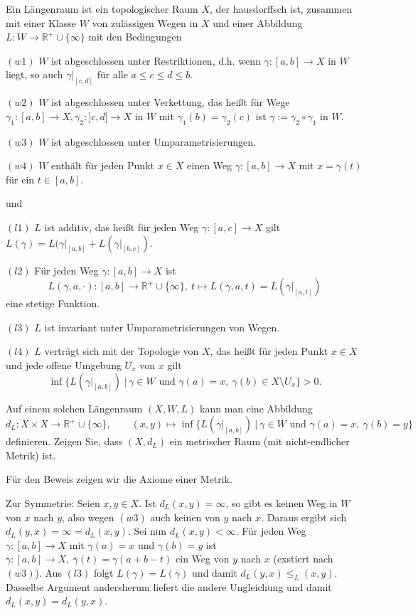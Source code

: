 \documentclass[11pt]{book}
\numberwithin{dummy}{section}
\theoremstyle{nonumberbreak}
\newenvironment{prob}[1][]{\ifthenelse{\equal{#1}{}}{\problem}{\problem[#1]}\rm}{\endproblem}
\newenvironment{sol}[1][]{\ifthenelse{\equal{#1}{}}{\solution}{\solution[#1]}\rm}{\endsolution}
\newcommand{\R}{\mathbb{R}}
\newcommand{\la}{\longrightarrow}
\begin{document}
\begin{spacing}{1.4}
\begin{prob}   %
Ein Längenraum ist ein topologischer Raum $X$, der hausdorffsch ist, zusammen mit einer Klasse $W$ von zulässigen Wegen in $X$ und einer Abbildung $L: W \la \R^+\cup \{\infty\}$ mit den Bedingungen
\begin{compactenum}
\item[$(w1)$] $W$ ist abgeschlossen unter Restriktionen, d.h. wenn $\gamma:[a,b] \la X$ in $W$ liegt, so auch $\gamma\vert_{[c,d]}$ für alle $a\leqslant c\leqslant d\leqslant b$.
\item[$(w2)$] $W$ ist abgeschlossen unter Verkettung, das heißt für Wege $\gamma_1:[a,b] \la X, \gamma_2:]c,d]\la X$ in $W$ mit $\gamma_1(b)=\gamma_2(c)$ ist $\gamma:=\gamma_2 \circ \gamma_1$ in $W$.
\item[$(w3)$] $W$ ist abgeschlossen unter Umparametrisierungen.
\item[$(w4)$] $W$ enthält für jeden Punkt $x \in X$ einen Weg $\gamma:[a,b]\la X$ mit $x=\gamma(t)$ für ein $t\in[a,b]$.
\end{compactenum}
und
\begin{compactenum}
\item[$(l1)$] $L$ ist additiv, das heißt für jeden Weg $\gamma:[a,c]\la X$ gilt $L(\gamma)= L(\gamma\vert_{[a,b]} + L(\gamma\vert_{[b,c]})$.
\item[$(l2)$] Für jeden Weg $\gamma:[a,b] \la X$ ist $$L(\gamma,a,\cdot): [a,b] \la \R^+ \cup \{\infty\}, \ t \mapsto L(\gamma,a,t)=L(\gamma\vert_{[a,t]})$$ eine stetige Funktion.
\item[$(l3)$] $L$ ist invariant unter Umparametrisierungen von Wegen.
\item[$(l4)$] $L$ verträgt sich mit der Topologie von $X$, das heißt für jeden Punkt $x \in X$ und jede offene Umgebung $U_x$ von $x$ gilt
$$\inf \{L(\gamma\vert_{[a,b]}) \ \vert \ \gamma \in W \textrm{  und } \gamma(a)=x, \ \gamma(b) \in X \setminus U_x \} >0.$$
\end{compactenum}
Auf einem solchen Längenraum $(X,W,L)$ kann man eine Abbildung 
$$d_L: X \times X \la \R^+ \cup \{\infty\}, \qquad (x,y)\mapsto \inf \{L(\gamma\vert_{[a,b]}) \ \vert \ \gamma \in W \textrm{ und } \gamma(a)=x, \ \gamma(b)=y\}$$
definieren. Zeigen Sie, dass $(X,d_L)$ ein metrischer Raum (mit nicht-endlicher Metrik) ist.

\begin{sol}
Für den Beweis zeigen wir die Axiome einer Metrik.
\begin{compactenum}
\item
Zur Symmetrie: Seien $x,y \in X$. Ist $d_L(x,y)=\infty$, so gibt es keinen Weg in $W$ von $x$ nach $y$, also wegen $(w3)$ auch keinen von $y$ nach $x$. Daraus ergibt sich $d_L(y,x)=\infty=d_L(x,y)$. Sei nun $d_L(x,y)<\infty$. Für jeden Weg $\gamma:[a,b] \la X$ mit $\gamma(a)=x$ und $\gamma(b)=y$ ist $\overline{\gamma}:[a,b] \la X, \ \overline{\gamma}(t)=\gamma(a+b-t)$ ein Weg von $y$ nach $x$ (exstiert nach $(w3)$). Aus $(l3)$ folgt $L(\gamma)=L(\overline{\gamma})$ und damit $d_L(y,x)\leqslant _L(x,y)$. Dasselbe Argument andersherum liefert die andere Ungleichung und damit $d_L(x,y)=d_L(y,x)$.


\end{compactenum}
\end{sol}
\end{prob}
\end{spacing}
\end{document}

